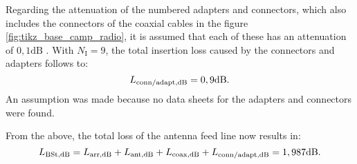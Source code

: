 Regarding the attenuation of the numbered adapters and connectors, which also includes the connectors of the coaxial cables in the figure \ref{fig:tikz_base_camp_radio}, it is assumed that each of these has an attenuation of $0,1 \mathrm{dB}$ \cite{LinkMargin:2016}. With $N_\mathrm{I} = 9$, the total insertion loss caused by the connectors and adapters follows to:
\begin{equation} \label{eq:losses_BSt_conn}
	\centering
	L_\mathrm{conn/adapt,dB} = 0,9\mathrm{dB}\text{.}
\end{equation}
An assumption was made because no data sheets for the adapters and connectors were found. 

From the above, the total loss of the antenna feed line now results in:
\begin{equation} \label{eq:losses_BSt}
	\centering
	L_\mathrm{BSt,dB} = L_\mathrm{arr,dB} + L_\mathrm{ant,dB} + L_\mathrm{coax,dB} + L_\mathrm{conn/adapt,dB} = 1,987\mathrm{dB}\text{.}
\end{equation}












